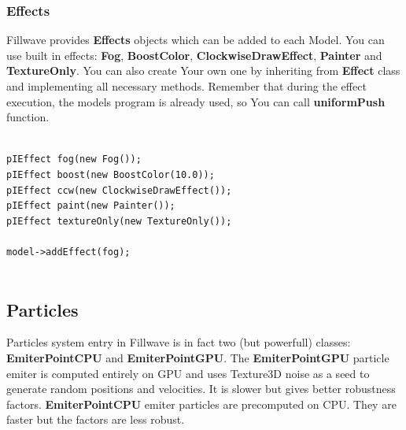 \documentclass{article}
\begin{document}
\subsubsection{Effects}\label{sec:Effects}
\indent \indent Fillwave provides \textbf{Effects} objects which can be added to each Model. You can use built in effects: \textbf{Fog}, \textbf{BoostColor}, \textbf{ClockwiseDrawEffect}, \textbf{Painter} and \textbf{TextureOnly}. You can also create Your own one by inheriting from \textbf{Effect} class and implementing all necessary methods. Remember that during the effect execution, the models program is already used, so You can call \textbf{uniformPush} function.

\begin{lstlisting}

pIEffect fog(new Fog());
pIEffect boost(new BoostColor(10.0));
pIEffect ccw(new ClockwiseDrawEffect());
pIEffect paint(new Painter());
pIEffect textureOnly(new TextureOnly());

model->addEffect(fog);
   
\end{lstlisting}

\subsection{Particles}\label{sec:Particles}
\indent \indent Particles system entry in Fillwave is in fact two (but powerfull) classes: \textbf{EmiterPointCPU} and \textbf{EmiterPointGPU}. The \textbf{EmiterPointGPU} particle emiter is computed entirely on GPU and uses Texture3D noise as a seed to generate random positions and velocities. It is slower but gives better robustness factors. \textbf{EmiterPointCPU} emiter particles are precomputed on CPU. They are faster but the factors are less robust.
\end{document}
